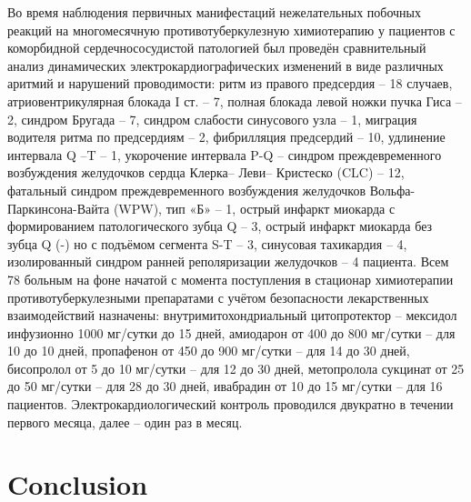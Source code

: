 \documentclass[runningheads]{AIIT}
\begin{document}
 Во время  наблюдения  первичных манифестаций нежелательных побочных реакций на многомесячную противотуберкулезную химиотерапию у пациентов с коморбидной сердечнососудистой патологией был проведён сравнительный анализ динамических электрокардиографических изменений в виде различных аритмий и нарушений проводимости: ритм из правого предсердия – 18 случаев, атриовентрикулярная блокада I ст. – 7, полная блокада левой ножки пучка Гиса – 2, синдром Бругада – 7, синдром слабости синусового узла – 1, миграция водителя ритма по предсердиям – 2, фибрилляция предсердий – 10, удлинение интервала Q –T – 1, укорочение интервала P-Q – синдром  преждевременного возбуждения желудочков сердца Клерка– Леви– Кристеско (CLC) – 12, фатальный синдром  преждевременного возбуждения желудочков  Вольфа-Паркинсона-Вайта (WPW), тип «Б» – 1, острый инфаркт миокарда с формированием патологического зубца Q – 3, острый инфаркт миокарда без зубца Q (-) но с подъёмом сегмента S-T – 3, синусовая тахикардия – 4, изолированный синдром ранней реполяризации желудочков  – 4 пациента.
Всем 78 больным на фоне начатой с момента поступления в стационар химиотерапии противотуберкулезными препаратами с учётом безопасности лекарственных взаимодействий назначены: внутримитохондриальный цитопротектор – мексидол инфузионно 1000 мг/сутки до 15 дней, амиодарон от 400 до 800 мг/сутки – для 10 до 10 дней, пропафенон от 450 до 900 мг/сутки – для 14 до 30 дней, бисопролол от 5 до 10 мг/сутки – для 12 до 30 дней, метопролола сукцинат от 25 до 50 мг/сутки  – для 28 до 30 дней, ивабрадин от 10 до 15 мг/сутки – для 16 пациентов. Электрокардиологический контроль проводился двукратно в течении первого месяца, далее – один раз в месяц.

\section*{Conclusion}
\end{document}

